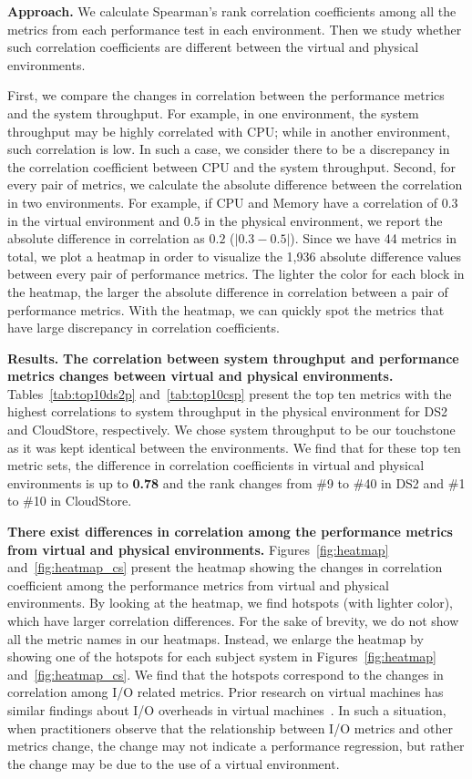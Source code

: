 \documentclass[smallextended]{svjour3}       %
\begin{document}
\noindent \textbf{Approach.} 
We calculate Spearman's rank correlation coefficients among all the metrics from each performance test in each environment. Then we study whether such correlation coefficients are different between the virtual and physical environments. 

First, we compare the changes in correlation between the performance metrics and the system throughput. For example, in one environment, the system throughput may be highly correlated with CPU; while in another environment, such correlation is low. In such a case, we consider there to be a discrepancy in the correlation coefficient between CPU and the system throughput. Second, for every pair of metrics, we calculate the absolute difference between the correlation in two environments. For example, if CPU and Memory have a correlation of $0.3$ in the virtual environment and $0.5$ in the physical environment, we report the absolute difference in correlation as $0.2$ ($|0.3-0.5|$). Since we have 44 metrics in total, we plot a heatmap in order to visualize the 1,936 absolute difference values between every pair of performance metrics. The lighter the color for each block in the heatmap, the larger the absolute difference in correlation between a pair of performance metrics. With the heatmap, we can quickly spot the metrics that have large discrepancy in correlation coefficients. 


\noindent \textbf{Results.}
\noindent \textbf{The correlation between system throughput and performance metrics changes between virtual and physical environments.} Tables~\ref{tab:top10ds2p} and~\ref{tab:top10csp} present the top ten metrics with the highest correlations to system throughput in the physical environment for DS2 and CloudStore, respectively. We chose system throughput to be our touchstone as it was kept identical between the environments.  We find that for these top ten metric sets, the difference in correlation coefficients in virtual and physical environments is up to \textbf{0.78} and the rank changes from \#9 to \#40 in DS2 and \#1 to \#10 in CloudStore.

\noindent \textbf{There exist differences in correlation among the performance metrics from virtual and physical environments.} Figures~\ref{fig:heatmap} and~\ref{fig:heatmap_cs} present the heatmap showing the changes in correlation coefficient among the performance metrics from virtual and physical environments. By looking at the heatmap, we find hotspots (with lighter color), which have larger correlation differences. For the sake of brevity, we do not show all the metric names in our heatmaps. Instead, we enlarge the heatmap by showing one of the hotspots for each subject system in Figures~\ref{fig:heatmap} and~\ref{fig:heatmap_cs}. We find that the hotspots correspond to the changes in correlation among I/O related metrics. Prior research on virtual machines has similar findings about I/O overheads in virtual machines~\cite{menon2005diagnosing,kraft2011io}. In such a situation, when practitioners observe that the relationship between I/O metrics and other metrics change, the change may not indicate a performance regression, but rather the change may be due to the use of a virtual environment.
\end{document}
